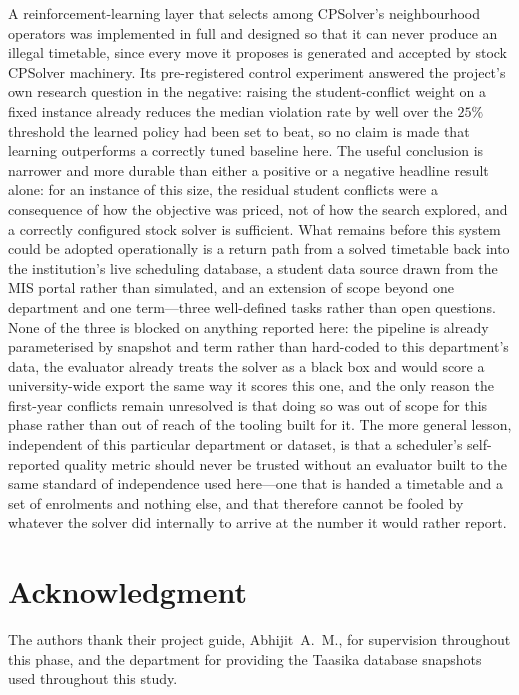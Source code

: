 \documentclass[journal]{IEEEtran}
\begin{document}
A reinforcement-learning layer that selects among CPSolver's neighbourhood operators was implemented in full and designed so that it can never produce an illegal timetable, since every move it proposes is generated and accepted by stock CPSolver machinery. Its pre-registered control experiment answered the project's own research question in the negative: raising the student-conflict weight on a fixed instance already reduces the median violation rate by well over the $25\%$ threshold the learned policy had been set to beat, so no claim is made that learning outperforms a correctly tuned baseline here. The useful conclusion is narrower and more durable than either a positive or a negative headline result alone: for an instance of this size, the residual student conflicts were a consequence of how the objective was priced, not of how the search explored, and a correctly configured stock solver is sufficient. What remains before this system could be adopted operationally is a return path from a solved timetable back into the institution's live scheduling database, a student data source drawn from the MIS portal rather than simulated, and an extension of scope beyond one department and one term---three well-defined tasks rather than open questions. None of the three is blocked on anything reported here: the pipeline is already parameterised by snapshot and term rather than hard-coded to this department's data, the evaluator already treats the solver as a black box and would score a university-wide export the same way it scores this one, and the only reason the first-year conflicts remain unresolved is that doing so was out of scope for this phase rather than out of reach of the tooling built for it. The more general lesson, independent of this particular department or dataset, is that a scheduler's self-reported quality metric should never be trusted without an evaluator built to the same standard of independence used here---one that is handed a timetable and a set of enrolments and nothing else, and that therefore cannot be fooled by whatever the solver did internally to arrive at the number it would rather report.

\section*{Acknowledgment}
The authors thank their project guide, Abhijit~A.~M., for supervision throughout this phase, and the department for providing the Taasika database snapshots used throughout this study.



\end{document}
